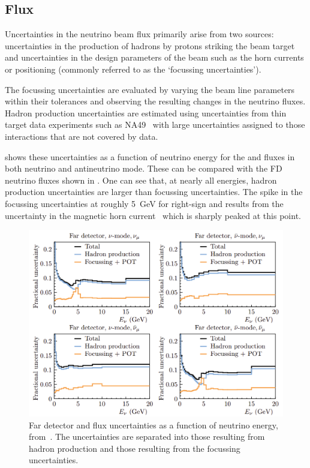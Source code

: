 \subsection{Flux}
\label{sec:dune_lbl:systs:flux}

Uncertainties in the neutrino beam flux primarily arise from two sources: uncertainties in the production of hadrons by protons striking the beam target and uncertainties in the design parameters of the beam such as the horn currents or positioning (commonly referred to as the `focussing uncertainties').

The focussing uncertainties are evaluated by varying the beam line parameters within their tolerances and observing the resulting changes in the neutrino fluxes.
Hadron production uncertainties are estimated using uncertainties from thin target data experiments such as NA49~\cite{na49} with large uncertainties assigned to those interactions that are not covered by data.

 shows these uncertainties as a function of neutrino energy for the \numu and \anumu fluxes in both neutrino and antineutrino mode.
These can be compared with the FD neutrino fluxes shown in .
One can see that, at nearly all energies, hadron production uncertainties are larger than focussing uncertainties.
The spike in the focussing uncertainties at roughly \SI{5}{\GeV} for right-sign \numu and \anumu results from the uncertainty in the magnetic horn current~\cite{tdrVol2} which is sharply peaked at this point.

\begin{figure}[h]
  \centering
  \includegraphics[width=.8\linewidth]{files/figures/dune_detector/fluxUncertainties}
  \caption[Far detector flux uncertainties for \numu and \anumu]{Far detector \numu and \anumu flux uncertainties as a function of neutrino energy, from~\cite{tdrVol2}. The uncertainties are separated into those resulting from hadron production and those resulting from the focussing uncertainties.}
  \label{fig:fluxUncertainties}
\end{figure}

